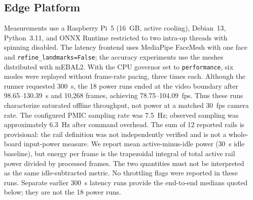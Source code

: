 \documentclass{IEEEmce}
\begin{document}
\subsection{Edge Platform}
Measurements use a Raspberry Pi~5 (16~GB, active cooling), Debian~13, Python~3.11, and
ONNX Runtime restricted to two intra-op threads with spinning disabled. The latency
frontend uses MediaPipe FaceMesh with one face and \texttt{refine\_landmarks=False}; the
accuracy experiments use the meshes distributed with mEBAL2. With the CPU governor set
to \texttt{performance}, six modes were replayed without frame-rate pacing, three times
each. Although the runner requested 300~s, the 18 power runs ended at the video boundary
after 98.65--130.39~s and 10,268 frames, achieving 78.75--104.09~fps. Thus these runs
characterize saturated offline throughput, not power at a matched 30~fps camera rate.
The configured PMIC sampling rate was 7.5~Hz; observed sampling was approximately
6.3~Hz after command overhead. The sum of 12 reported rails is provisional: the rail
definition was not independently verified and is not a whole-board input-power measure.
We report mean active-minus-idle power (30~s idle baseline), but energy per frame is
the trapezoidal integral of total active rail power divided by processed frames.
The two quantities must not be interpreted as the same idle-subtracted metric.
No throttling flags were reported in these runs. Separate earlier 300~s latency runs
provide the end-to-end medians quoted below; they are not the 18 power runs.
\end{document}
